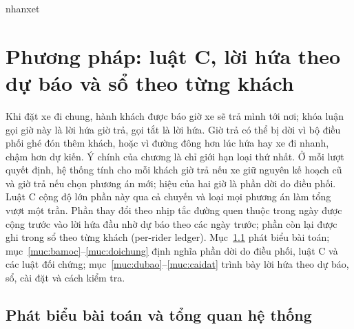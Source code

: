 
\ifcsname nhanxet\endcsname\else
  \theoremstyle{definition}
  \newtheorem{nhanxet}{Nhận xét}[chapter]
\fi

\chapter{Phương pháp: luật C, lời hứa theo dự báo và sổ theo từng khách}
\label{chuong:phuongphap}

Khi đặt xe đi chung, hành khách được báo giờ xe sẽ trả mình tới nơi; khóa luận gọi giờ này là lời hứa giờ
trả, gọi tắt là lời hứa. Giờ trả có thể bị dời vì bộ điều phối ghé đón thêm khách, hoặc vì đường đông hơn lúc
hứa hay xe đi nhanh, chậm hơn dự kiến. Ý chính của chương là chỉ giới hạn loại thứ nhất. Ở mỗi lượt quyết
định, hệ thống tính cho mỗi khách giờ trả nếu xe giữ nguyên kế hoạch cũ và giờ trả nếu chọn phương án mới;
hiệu của hai giờ là phần dời do điều phối. Luật C cộng độ lớn phần này qua cả chuyến và loại mọi phương án
làm tổng vượt một trần. Phần thay đổi theo nhịp tắc đường quen thuộc trong ngày được cộng trước vào lời hứa
đầu nhờ dự báo theo các ngày trước; phần còn lại được ghi trong sổ theo từng khách (per-rider ledger).
Mục~\ref{muc:baitoan} phát biểu bài toán; mục~\ref{muc:bamoc}--\ref{muc:doichung} định nghĩa phần dời do
điều phối, luật C và các luật đối chứng; mục~\ref{muc:dubao}--\ref{muc:caidat} trình bày lời hứa theo dự
báo, sổ, cài đặt và cách kiểm tra.

\section{Phát biểu bài toán và tổng quan hệ thống}
\label{muc:baitoan}

